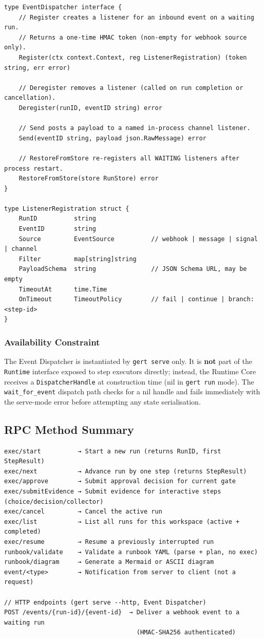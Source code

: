 \begin{verbatim}
type EventDispatcher interface {
    // Register creates a listener for an inbound event on a waiting run.
    // Returns a one-time HMAC token (non-empty for webhook source only).
    Register(ctx context.Context, reg ListenerRegistration) (token string, err error)

    // Deregister removes a listener (called on run completion or cancellation).
    Deregister(runID, eventID string) error

    // Send posts a payload to a named in-process channel listener.
    Send(eventID string, payload json.RawMessage) error

    // RestoreFromStore re-registers all WAITING listeners after process restart.
    RestoreFromStore(store RunStore) error
}

type ListenerRegistration struct {
    RunID          string
    EventID        string
    Source         EventSource          // webhook | message | signal | channel
    Filter         map[string]string
    PayloadSchema  string               // JSON Schema URL, may be empty
    TimeoutAt      time.Time
    OnTimeout      TimeoutPolicy        // fail | continue | branch:<step-id>
}
\end{verbatim}

\subsubsection*{Availability Constraint}

The Event Dispatcher is instantiated by \texttt{gert serve} only. It is \textbf{not} part of
the \texttt{Runtime} interface exposed to step executors directly; instead, the Runtime Core
receives a \texttt{DispatcherHandle} at construction time (nil in \texttt{gert run} mode).
The \texttt{wait\_for\_event} dispatch path checks for a nil handle and fails immediately
with the serve-mode error before attempting any state serialisation.

\subsection{RPC Method Summary}

\begin{verbatim}
exec/start          → Start a new run (returns RunID, first StepResult)
exec/next           → Advance run by one step (returns StepResult)
exec/approve        → Submit approval decision for current gate
exec/submitEvidence → Submit evidence for interactive steps (choice/decision/collector)
exec/cancel         → Cancel the active run
exec/list           → List all runs for this workspace (active + completed)
exec/resume         → Resume a previously interrupted run
runbook/validate    → Validate a runbook YAML (parse + plan, no exec)
runbook/diagram     → Generate a Mermaid or ASCII diagram
event/<type>        → Notification from server to client (not a request)

// HTTP endpoints (gert serve --http, Event Dispatcher)
POST /events/{run-id}/{event-id}  → Deliver a webhook event to a waiting run
                                    (HMAC-SHA256 authenticated)
\end{verbatim}
